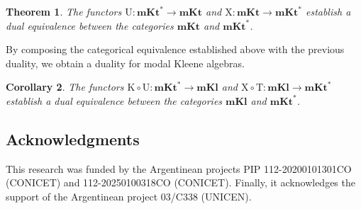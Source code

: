 \documentclass{article}
\newtheorem{theorem}{Theorem}[section]
\newtheorem{corollary}[theorem]{Corollary}
\begin{document}
\begin{theorem}
\label{thm:mKt-duality}
The functors $\mathrm{U} \colon \mathbf{mKt}^{*} \to \mathbf{mKt}$ and $\mathrm{X} \colon \mathbf{mKt} \to \mathbf{mKt}^{*}$ establish a dual equivalence between the categories $\mathbf{mKt}$ and $\mathbf{mKt}^{*}$.
\end{theorem}

By composing the categorical equivalence established above with the previous duality, we obtain a duality for modal Kleene algebras.

\begin{corollary}
    The functors $\mathrm{K} \circ \mathrm{U}\colon \mathbf{mKt}^{*}\to \mathbf{mKl}$ and $ \mathrm{X} \circ \mathrm{T}\colon \mathbf{mKl}\to \mathbf{mKt}^{*}$  establish a dual equivalence between the categories $\mathbf{mKl}$ and $\mathbf{mKt}^{*}$.
\end{corollary}



\subsection*{Acknowledgments}
This research was funded by the Argentinean projects PIP 112-20200101301CO (CONICET) and 112-20250100318CO (CONICET). Finally, it acknowledges the support of the Argentinean project 03/C338 (UNICEN).
\end{document}
